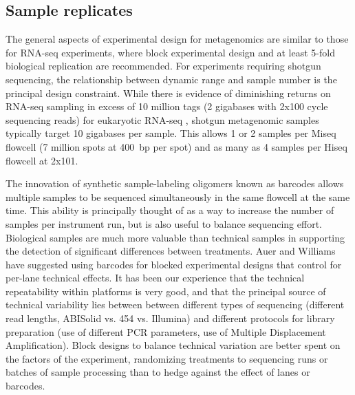 \documentclass[graybox]{svmult}
\begin{document}
\subsection{Sample replicates} 
\label{subsec:2}
%
The general aspects of experimental design for metagenomics are similar to those for RNA-seq experiments, where block experimental design and at least 5-fold biological replication are recommended.
For experiments requiring shotgun sequencing, the relationship between dynamic range and sample number is the principal design constraint. \cite{Auer}    While there is evidence of diminishing returns on RNA-seq sampling in excess of 10 million tags (2 gigabases with 2x100 cycle sequencing reads) for eukaryotic RNA-seq \cite{Wang}, shotgun metagenomic samples typically target 10 gigabases per sample.     This allows 1 or 2 samples per Miseq flowcell  (7 million spots at 400~bp per spot) and as many as 4 samples per Hiseq flowcell at 2x101.
%


The innovation of synthetic sample-labeling oligomers known as barcodes allows multiple samples to be sequenced simultaneously in the same flowcell at the same time.  This ability is principally thought of as a way to increase the number of samples per instrument run, but is also useful to balance sequencing effort.     Biological samples are much more valuable than technical samples in supporting the detection of significant differences between treatments. 
Auer\cite{Auer} and Williams\cite{Williams} have suggested using barcodes for blocked experimental designs that control for per-lane technical effects.   It has been our experience that the technical repeatability within platforms is very good, and that the principal source of technical variability lies between between different types of sequencing (different read lengths, ABISolid vs. 454 vs. Illumina) and different protocols for library preparation (use of different PCR parameters, use of Multiple Displacement Amplification).  Block designs to balance technical variation are better spent on the factors of the experiment, randomizing treatments to sequencing runs or batches of sample processing than to hedge against the effect of lanes or barcodes.  
\end{document}
